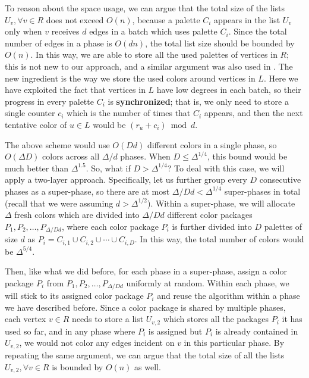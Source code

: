 \documentclass[11pt,a4paper]{article}
\begin{document}
To reason about the space usage, we can argue that the total size of the lists $U_v, \forall v\in R$ does not exceed $O(n)$, because a palette $C_i$ appears in the list $U_v$ only when $v$ receives $d$ edges in a batch which uses palette $C_i$. Since the total number of edges in a phase is $O(dn)$, the total list size should be bounded by $O(n)$. In this way, we are able to store all the used palettes of vertices in $R$; this is not new to our approach, and a similar argument was also used in \cite{chechik_et_al:LIPIcs.ICALP.2024.40}. The new ingredient is the way we store the used colors around vertices in $L$. Here we have exploited the fact that vertices in $L$ have low degrees in each batch, so their progress in every palette $C_i$ is \textbf{synchronized}; that is, we only need to store a single counter $c_i$ which is the number of times that $C_i$ appears, and then the next tentative color of $u\in L$ would be $(r_u + c_i) \bmod d$. 

The above scheme would use $O(Dd)$ different colors in a single phase, so $O(\Delta D)$ colors across all $\Delta /d$ phases. When $D\leq \Delta^{1/4}$, this bound would be much better than $\Delta^{1.5}$. So, what if $D > \Delta^{1/4}$? To deal with this case, we will apply a two-layer approach. Specifically, let us further group every $D$ consecutive phases as a super-phase, so there are at most $\Delta / Dd < \Delta^{1/4}$ super-phases in total (recall that we were assuming $d > \Delta^{1/2}$). Within a super-phase, we will allocate $\Delta$ fresh colors which are divided into $\Delta / Dd$ different color packages $P_1, P_2, \ldots, P_{\Delta / Dd}$, where each color package $P_i$ is further divided into $D$ palettes of size $d$ as $P_i = C_{i, 1}\cup C_{i, 2}\cup\cdots\cup C_{i, D}$. In this way, the total number of colors would be $\Delta^{5/4}$. 

Then, like what we did before, for each phase in a super-phase, assign a color package $P_i$ from $P_1, P_2, \ldots, P_{\Delta / Dd}$ uniformly at random. Within each phase, we will stick to its assigned color package $P_i$ and reuse the algorithm within a phase we have described before. Since a color package is shared by multiple phases, each vertex $v\in R$ needs to store a list $U_{v, 2}$ which stores all the packages $P_i$ it has used so far, and in any phase where $P_i$ is assigned but $P_i$ is already contained in $U_{v, 2}$, we would not color any edges incident on $v$ in this particular phase. By repeating the same argument, we can argue that the total size of all the lists $U_{v, 2}, \forall v\in R$ is bounded by $O(n)$ as well.
\end{document}
